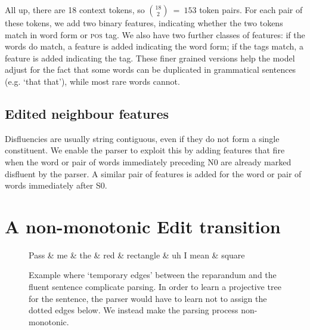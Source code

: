 \documentclass[11pt,letterpaper]{article}
\newcommand{\pos}{\textsc{pos}\xspace}
\newcommand{\szero}{S0\xspace}
\begin{document}
All up, there are 18 context tokens, so ${18 \choose 2}~=~153$ token pairs.
For each pair of these tokens, we add two binary features, indicating whether the
two tokens match in word form or \pos tag.  We also have two further classes of
features: if the words do match, a feature is added indicating the word form;
if the tags match, a feature is added indicating the tag. These finer grained
versions help the model adjust for the fact that some words can be duplicated
in grammatical sentences (e.g. `that that'), while most rare words cannot.

\subsection{Edited neighbour features}

Disfluencies are usually
string contiguous, even if they do not form a single constituent.  
We enable the parser to exploit this by adding features that fire when the word
or pair of words immediately preceding N0 are already marked disfluent by the parser.
A similar pair of features is
added for the word or pair of words immediately after \szero.

\section{A non-monotonic Edit transition}
\label{sec:edittrans}
\begin{figure}
    \small
\begin{dependency}[theme=simple, segmented edge]
    \begin{deptext}[column sep=.075cm, row sep=.1ex]
    Pass \& me \& the \& red \& rectangle \& uh I mean \& square \\
    \end{deptext}
    \end{dependency}
    \caption{\small Example where `temporary edges' between the reparandum and the
    fluent sentence complicate parsing. In order to learn a projective tree
    for the sentence, the parser would have to learn not to assign the dotted
    edges below. We instead make the parsing process non-monotonic.
\label{fig:rectangle}}
\end{figure}
\end{document}
